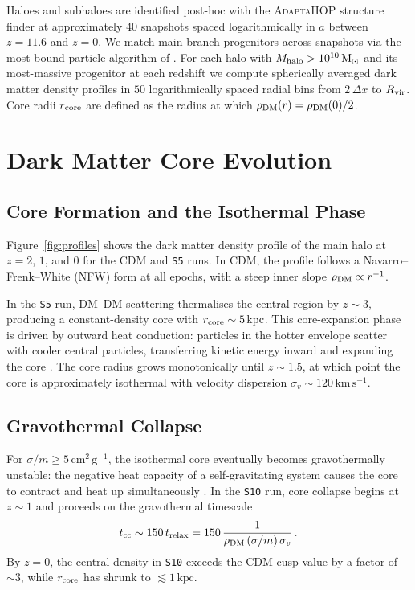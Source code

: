\documentclass[fleqn,usenatbib]{mnras}
\newcommand{\code}[1]{\texttt{#1}}
\newcommand{\sigmam}{\sigma/m}
\newcommand{\kms}{\,\mathrm{km\,s^{-1}}}
\newcommand{\Msun}{\mathrm{M_\odot}}
\newcommand{\kpc}{\,\mathrm{kpc}}
\newcommand{\rhoDM}{\rho_{\rm DM}}
\newcommand{\rcore}{r_{\rm core}}
\newcommand{\tcc}{t_{\rm cc}}
\newcommand{\trelax}{t_{\rm relax}}
\newcommand{\vdisp}{\sigma_v}
\begin{document}
Haloes and subhaloes are identified post-hoc with the
\textsc{AdaptaHOP} structure finder \citep{Aubert2004} at
approximately $40$ snapshots spaced logarithmically in $a$ between
$z=11.6$ and $z=0$.  We match main-branch progenitors across
snapshots via the most-bound-particle algorithm of
\citet{Tweed2009}.  For each halo with $M_{\rm halo}>10^{10}\,\Msun$
and its most-massive progenitor at each redshift we compute
spherically averaged dark matter density profiles in $50$
logarithmically spaced radial bins from $2\,\Delta x$ to
$R_{\rm vir}$.  Core radii $\rcore$ are defined as the radius at
which $\rhoDM(r) = \rhoDM(0)/2$.


\section{Dark Matter Core Evolution}
\label{sec:core_evolution}

\subsection{Core Formation and the Isothermal Phase}
\label{sec:core_formation}

Figure~\ref{fig:profiles} shows the dark matter density profile of the
main halo at $z = 2$, $1$, and $0$ for the CDM and \code{S5} runs.
In CDM, the profile follows a Navarro--Frenk--White (NFW) form
\citep{NFW1996} at all epochs, with a steep inner slope
$\rhoDM \propto r^{-1}$.

In the \code{S5} run, DM--DM scattering thermalises the central
region by $z \sim 3$, producing a constant-density core with $\rcore
\sim 5\kpc$.  This core-expansion phase is driven by outward heat
conduction: particles in the hotter envelope scatter with cooler
central particles, transferring kinetic energy inward and expanding the
core \citep{Balberg2002}.  The core radius grows monotonically until
$z \sim 1.5$, at which point the core is approximately isothermal with
velocity dispersion $\vdisp \sim 120\kms$.

\subsection{Gravothermal Collapse}
\label{sec:gravothermal}

For $\sigmam \ge 5\,\mathrm{cm^2\,g^{-1}}$, the isothermal core
eventually becomes gravothermally unstable: the negative heat capacity
of a self-gravitating system causes the core to contract and heat up
simultaneously \citep{LyndenBell1968}.  In the \code{S10} run, core
collapse begins at $z \sim 1$ and proceeds on the gravothermal
timescale
\begin{equation}
  \tcc \sim 150\,\trelax
    = 150\,\frac{1}{\rhoDM\,(\sigmam)\,\vdisp}\,.
  \label{eq:tcc}
\end{equation}
By $z = 0$, the central density in \code{S10} exceeds the CDM cusp
value by a factor of $\sim 3$, while $\rcore$ has shrunk to
$\lesssim 1\kpc$.
\end{document}
